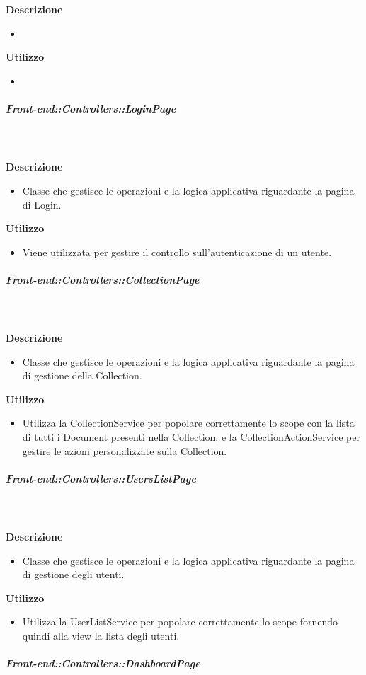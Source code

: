         \textbf{\\ \\ Descrizione} 
          \begin{itemize}
            \item[] 
          \end{itemize}      
        \textbf{Utilizzo}  
          \begin{itemize}
            \item[] 
          \end{itemize}
      \subparagraph{Front-end::Controllers::LoginPage}
        
        \textbf{\\ \\ Descrizione} 
          \begin{itemize}
            \item[] Classe che gestisce le operazioni e la logica applicativa riguardante la pagina di Login.
          \end{itemize}      
        \textbf{Utilizzo}  
          \begin{itemize}
            \item[] Viene utilizzata per gestire il controllo sull'autenticazione di un utente.
          \end{itemize}
      \subparagraph{Front-end::Controllers::CollectionPage}
        
        \textbf{\\ \\ Descrizione} 
          \begin{itemize}
            \item[] Classe che gestisce le operazioni e la logica applicativa riguardante la pagina di gestione della Collection.
          \end{itemize}      
        \textbf{Utilizzo}  
          \begin{itemize}
            \item[] Utilizza la CollectionService per popolare correttamente lo scope con la lista di tutti i Document presenti nella Collection, e la CollectionActionService per gestire le azioni personalizzate sulla Collection.
          \end{itemize}
      \subparagraph{Front-end::Controllers::UsersListPage}
        
        \textbf{\\ \\ Descrizione} 
          \begin{itemize}
            \item[] Classe che gestisce le operazioni e la logica applicativa riguardante la pagina di gestione degli utenti.
          \end{itemize}      
        \textbf{Utilizzo}  
          \begin{itemize}
            \item[] Utilizza la UserListService per popolare correttamente lo scope fornendo quindi alla view la lista degli utenti.
          \end{itemize}
      \subparagraph{Front-end::Controllers::DashboardPage}
        
